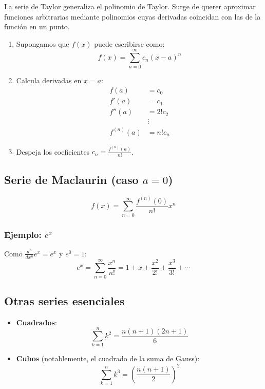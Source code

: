 \documentclass[letterpaper, 12pt]{article}
\begin{document}
	La serie de Taylor generaliza el polinomio de Taylor. Surge de querer aproximar funciones arbitrarias mediante polinomios cuyas derivadas coincidan con las de la función en un punto.
	
	\begin{enumerate}
		\item Supongamos que $f(x)$ puede escribirse como:
		\[
		f(x) = \sum_{n=0}^\infty c_n (x-a)^n
		\]
		
		\item Calcula derivadas en $x = a$:
		\begin{align*}
			f(a) &= c_0 \\
			f'(a) &= c_1 \\
			f''(a) &= 2! c_2 \\
			&\vdots \\
			f^{(n)}(a) &= n! c_n
		\end{align*}
		
		\item Despeja los coeficientes $c_n = \frac{f^{(n)}(a)}{n!}$.
	\end{enumerate}
	
	\subsection{Serie de Maclaurin (caso $a=0$)}
	
	\[
	f(x) = \sum_{n=0}^\infty \frac{f^{(n)}(0)}{n!}x^n
	\]
	
	\subsubsection{Ejemplo: $e^x$}
	
	Como $\frac{d^n}{dx^n}e^x = e^x$ y $e^0 = 1$:
	\[
	e^x = \sum_{n=0}^\infty \frac{x^n}{n!} = 1 + x + \frac{x^2}{2!} + \frac{x^3}{3!} + \cdots
	\]
	
	\subsection{Otras series esenciales}
	
	\begin{itemize}
		\item \textbf{Cuadrados}:
		\[
		\sum_{k=1}^n k^2 = \frac{n(n+1)(2n+1)}{6}
		\]
		
		\item \textbf{Cubos} (notablemente, el cuadrado de la suma de Gauss):
		\[
		\sum_{k=1}^n k^3 = \left( \frac{n(n+1)}{2} \right)^2
		\]
	\end{itemize}
	
\end{document}
